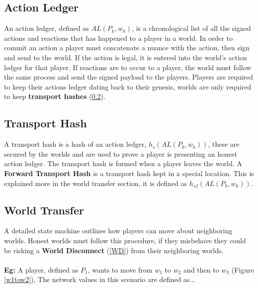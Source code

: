 \documentclass[runningheads,a4paper]{llncs}
\begin{document}
\subsection{Action Ledger}
\label{AL}
An action ledger, defined as $AL(P_{k}, w_k)$, is a chronological list of all the signed actions and reactions that has happened to a player in a world. In order to commit an action a player must concatenate a nuance with the action, then sign and send to the world. If the action is legal, it is entered into the world's action ledger for that player. If reactions are to occur to a player, the world must follow the same process and send the signed payload to the players. Players are required to keep their actions ledger dating back to their genesis, worlds are only required to keep \textbf{transport hashes} (\ref{TH}).

\subsection{Transport Hash}
\label{TH}
A transport hash is a hash of an action ledger, $h_s(AL(P_{k}, w_k))$, these are secured by the worlds and are used to prove a player is presenting an honest action ledger. The transport hash is formed when a player leaves the world. A \textbf{Forward Transport Hash} is a transport hash kept in a special location. This is explained more in the world transfer section, it is defined as  $h_{sf}(AL(P_{k}, w_k))$.

\subsection{World Transfer} 
\label{WT}
A detailed state machine outlines how players can move about neighboring worlds. Honest worlds must follow this procedure, if they misbehave they could be risking a \textbf{World Disconnect} (\ref{WD}) from their neighboring worlds. 
\\
\\
\textbf{Eg:} A player, defined as $P_1$, wants to move from $w_1$ to $w_2$ and then to $w_3$ (Figure \ref{w1tow2}), The network values in this scenario are defined as...
\end{document}
